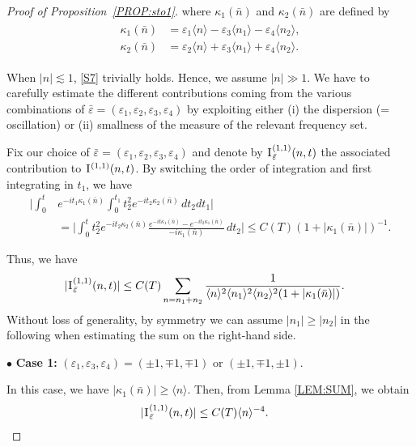 \documentclass[%
11pt,  reqno]{amsart}
\newcommand{\1}{\hspace{0.2mm}\text{I}\hspace{0.2mm}}
\newcommand{\noi}{\noindent}
\newcommand{\eps}{\varepsilon}
\newcommand{\kk}{\kappa}
\newcommand{\les}{\lesssim}
\newcommand{\jb}[1]
{\langle #1 \rangle}
\numberwithin{equation}{section}
\numberwithin{theorem}{section}
\begin{document}
\begin{proof}[Proof of Proposition~\ref{PROP:sto1}]
\noi
where $\kk_1( \bar n)$ and $\kk_2( \bar n)$ are defined by 
\begin{align*}
\begin{split}
\kk_1(\bar n) & = %
 \eps_1 \jb{n} -\eps_3 \jb{n_1} - \eps_4\jb{n_2}, \\ %
\kk_2(\bar n) & = %
 \eps_2 \jb{n} +\eps_3 \jb{n_1} + \eps_4\jb{n_2}.
\end{split}
\end{align*}

\noi
When $|n| \les 1$, \eqref{S7} trivially holds.
Hence, we assume $|n|\gg 1$. 
We have to carefully  estimate the different 
contributions coming from the various combinations of  $\bar \eps = (\eps_1, \eps_2, \eps_3, \eps_4)$
by  exploiting either (i) the dispersion (= oscillation) 
or (ii) smallness of the measure of the relevant frequency set.

Fix our choice of $\bar \eps = (\eps_1, \eps_2, \eps_3, \eps_4)$ 
and denote by $\1^{(1,1)}_{\bar \eps}(n,t)$ the associated contribution to $\1^{(1,1)}(n,t)$.
By switching the order of integration and first integrating in $t_1$, we have 
\begin{align*}
\bigg|\int_0^{t} 
& e^{-i t_1 \kk_1( \bar n)}
 \int_0^{t_1} 
t_2^2   e^{-i t_2\kk_2(\bar n)}
 \, dt_2dt_1\bigg| \\
& = \bigg| \int_0^{t} 
t_2^2   e^{-i t_2\kk_2(\bar n)}
\frac{e^{-i t \kk_1( \bar n)} - e^{-i t_2 \kk_1( \bar n)}}{-i \kk_1(\bar n)}
 \, dt_2\bigg| \le C(T) (1+ |\kk_1(\bar n)|)^{-1}.
\end{align*}


\noi
Thus,  we have 
\begin{align}
|\1^{(1,1)}_{\bar \eps} (n, t)|
& \le C(T)   
\sum_{n = n_1 + n_2} 
\frac{1}{\jb{n}^2\jb{n_1}^2 \jb{n_2}^2(1+ |\kk_1(\bar n)|)}.
\label{SS1}
\end{align}
Without loss of generality, by symmetry we can assume $|n_1|\geq |n_2|$ in the following when estimating
the sum on the right-hand side.

\smallskip

\noi
$\bullet$ {\bf Case 1:}
$(\eps_1, \eps_3, \eps_4) = (\pm 1, \mp1, \mp1)$ or
$(\pm1, \mp1, \pm1)$.

In this case, we have 
$|\kk_1(\bar n)| \geq \jb{n}$.
Then, from Lemma \ref{LEM:SUM}, we obtain
\begin{align*}
|\1^{(1,1)}_{\bar \eps} (n, t)|
& \le C(T)   \jb{n}^{-4}.
\end{align*}


\end{proof}
\end{document}
